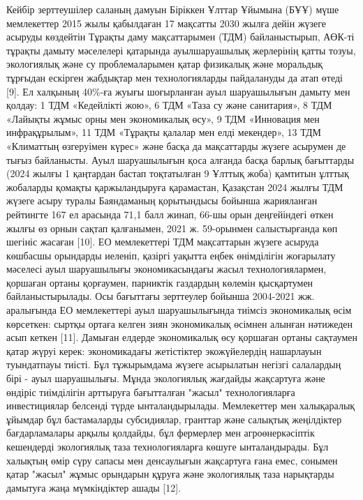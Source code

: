 {{Кейбір зерттеушілер саланың дамуын Біріккен Ұлттар Ұйымына (БҰҰ) мүше
мемлекеттер 2015 жылы қабылдаған 17 мақсатты 2030 жылға дейін жүзеге
асыруды көздейтін Тұрақты даму мақсаттарымен (ТДМ) байланыстырып, АӨК-ті
тұрақты дамыту мәселелері қатарында ауылшаруашылық жерлерінің қатты
тозуы, экологиялық және су проблемаларымен қатар физикалық және
моральдық тұрғыдан ескірген жабдықтар мен технологияларды пайдалануды да
атап өтеді {[}9{]}. Ел халқының 40\%-ға жуығы шоғырланған ауыл
шаруашылығын дамыту мен қолдау: 1 ТДМ «Кедейлікті жою», 6 ТДМ «Таза су
және санитария», 8 ТДМ «Лайықты жұмыс орны мен экономикалық өсу», 9 ТДМ
«Инновация мен инфрақұрылым», 11 ТДМ «Тұрақты қалалар мен елді
мекендер», 13 ТДМ «Климаттың өзгеруімен күрес» және басқа да мақсаттарды
жүзеге асырумен де тығыз байланысты. Ауыл шаруашылығын қоса алғанда
басқа барлық бағыттарды (2024 жылғы 1 қаңтардан бастап тоқтатылған 9
Ұлттық жоба) қамтитын ұлттық жобаларды қомақты қаржыландыруға
қарамастан, Қазақстан 2024 жылғы ТДМ жүзеге асыру туралы Баяндаманың
қорытындысы бойынша жарияланған рейтингте 167 ел арасында 71,1 балл
жинап, 66-шы орын деңгейіндегі өткен жылғы өз орнын сақтап қалғанымен,
2021 ж. 59-орынмен салыстырғанда көп шегініс жасаған {[}10{]}. ЕО
мемлекеттері ТДМ мақсаттарын жүзеге асыруда көшбасшы орындарды иеленіп,
қазіргі уақытта еңбек өнімділігін жоғарылату мәселесі ауыл шаруашылығы
экономикасындағы жасыл технологиялармен, қоршаған ортаны қорғаумен,
парниктік газдардың көлемін қысқартумен байланыстырылады. Осы бағыттағы
зерттеулер бойынша 2004-2021 жж. аралығында ЕО мемлекеттері ауыл
шаруашылығында тиімсіз экономикалық өсім көрсеткен: сыртқы ортаға келген
зиян экономикалық өсімнен алынған нәтижеден асып кеткен {[}11{]}.
Дамыған елдерде экономикалық өсу қоршаған ортаны сақтаумен қатар жүруі
керек: экономикадағы жетістіктер экожүйелердің нашарлауын туындатпауы
тиісті. Бұл тұжырымдама жүзеге асырылатын негізгі салалардың бірі - ауыл
шаруашылығы. Мұнда экологиялық жағдайды жақсартуға және өндіріс
тиімділігін арттыруға бағытталған "жасыл" технологияларға инвестициялар
белсенді түрде ынталандырылады. Мемлекеттер мен халықаралық ұйымдар бұл
бастамаларды субсидиялар, гранттар және салықтық жеңілдіктер
бағдарламалары арқылы қолдайды, бұл фермерлер мен агроөнеркәсіптік
кешендерді экологиялық таза технологияларға көшуге ынталандырады. Бұл
халықтың өмір сүру сапасы мен денсаулығын жақсартуға ғана емес, сонымен
қатар "жасыл" жұмыс орындарын құруға және экологиялық таза нарықтарды
дамытуға жаңа мүмкіндіктер ашады {[}12{]}.

}}

